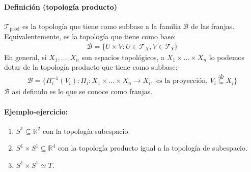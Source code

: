 \paragraph{Definición (topología producto)}  $\mathcal T_{\text{prod}}$ es la topología que tiene como subbase a la familia $\mathcal B$ de las franjas. Equivalentemente, es la topología que tiene como base:
\begin{align*}
    \mathcal B = \{U \times V : U \in \mathcal T_X, V \in \mathcal T_Y\}
\end{align*}
En general, si $X_1, \dots, X_n$ son espacios topológicos, a $X_1 \times \dots \times X_n$ lo podemos dotar de la topología producto que tiene como subbase:
\begin{align*}
    \mathcal B = \{\Pi_i^{-1}(V_i): \Pi_i: X_1 \times \dots \times X_n \to X_i, \text{ es la proyección, } V_i \overset{\text{ab}}{\subseteq} X_i\}
\end{align*}
$\mathcal B$ asi definido es lo que se conoce como franjas.

\paragraph{Ejemplo-ejercicio:}
\begin{enumerate}
    \item $S^1 \subseteq \mathbb R^2$ con la topología subespacio.
    \item $S^1 \times S^1 \subseteq \mathbb R^4$ con la topología producto igual a la topología de subespacio.
    \item $S^1\times S^1 \simeq T$.
\end{enumerate}

